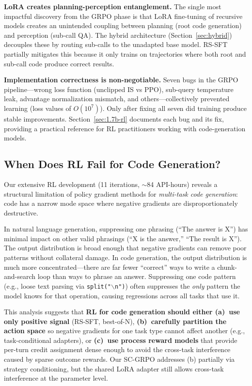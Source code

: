 \documentclass{article}
\begin{document}
\textbf{LoRA creates planning-perception entanglement.} The single most impactful discovery from the GRPO phase is that LoRA fine-tuning of recursive models creates an unintended coupling between planning (root code generation) and perception (sub-call QA). The hybrid architecture (Section~\ref{sec:hybrid}) decouples these by routing sub-calls to the unadapted base model. RS-SFT partially mitigates this because it only trains on trajectories where both root and sub-call code produce correct results.

\textbf{Implementation correctness is non-negotiable.} Seven bugs in the GRPO pipeline---wrong loss function (unclipped IS vs PPO), sub-query temperature leak, advantage normalization mismatch, and others---collectively prevented learning (loss values of $O(10^7)$). Only after fixing all seven did training produce stable improvements. Section~\ref{sec:1.7b-rl} documents each bug and its fix, providing a practical reference for RL practitioners working with code-generation models.

\subsection{When Does RL Fail for Code Generation?}
\label{sec:when-rl-fails}

Our extensive RL development (11 iterations, $\sim$84 API-hours) reveals a structural limitation of policy gradient methods for \emph{multi-task code generation}: code has a narrow mode space where negative gradients are disproportionately destructive.

In natural language generation, suppressing one phrasing (``The answer is X'') has minimal impact on other valid phrasings (``X is the answer,'' ``The result is X''). The output distribution is broad enough that negative gradients can remove poor patterns without collateral damage. In code generation, the output distribution is much more concentrated---there are far fewer ``correct'' ways to write a chunk-and-search loop than ways to phrase an answer. Suppressing one code pattern (e.g., loose text parsing via \texttt{split("$\backslash$n")}) often suppresses the \emph{only} pattern the model knows for that operation, causing regressions across all tasks that use it.

This analysis suggests that \textbf{RL for code generation should either (a)~use only positive signal} (RS-SFT, best-of-N), \textbf{(b)~carefully partition the action space} so negative gradients for one task type cannot affect another (e.g., task-conditional adapters), or \textbf{(c)~use process reward models} that provide per-turn credit assignment dense enough to avoid the cross-task interference caused by sparse outcome rewards. Our SC-GRPO addresses (b) partially via strategy conditioning, but the shared LoRA adapter still allows cross-task interference at the parameter level.
\end{document}
